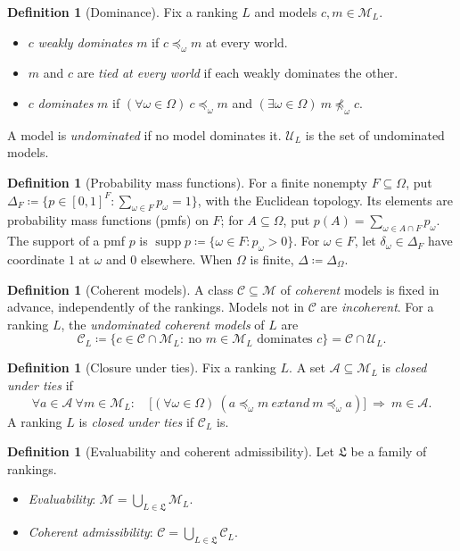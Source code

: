 \documentclass[11pt]{article}
\theoremstyle{definition}
\newtheorem{definition}[theorem]{Definition}
\theoremstyle{remark}
\newcommand{\M}{\mathcal M}
\newcommand{\C}{\mathcal C}
\newcommand{\U}{\mathcal U}
\newcommand{\Lf}{\mathfrak L}
\newcommand{\supp}{\operatorname{supp}}
\begin{document}
\begin{definition}[Dominance]\label{def:dominance}
Fix a ranking $L$ and models $c,m\in\M_L$.
\begin{itemize}[leftmargin=*]
\item $c$ \emph{weakly dominates} $m$ if $c\preceq_\omega m$ at every world.
\item $m$ and $c$ are \emph{tied at every world} if each weakly dominates the other.
\item $c$ \emph{dominates} $m$ if $(\forall\omega\in\Omega)\ c\preceq_\omega m$ and $(\exists\omega\in\Omega)\ m\not\preceq_\omega c$.
\end{itemize}
A model is \emph{undominated} if no model dominates it. $\U_L$ is the set of undominated models.
\end{definition}

\begin{definition}[Probability mass functions]\label{def:priors}
For a finite nonempty $F\subseteq\Omega$, put $\Delta_F\coloneqq\{p\in[0,1]^F:\sum_{\omega\in F}p_\omega=1\}$, with the Euclidean topology. Its elements are probability mass functions (pmfs) on $F$; for $A\subseteq\Omega$, put $p(A)=\sum_{\omega\in A\cap F}p_\omega$. The support of a pmf $p$ is $\supp p\coloneqq\{\omega\in F:p_\omega>0\}$. For $\omega\in F$, let $\delta_\omega\in\Delta_F$ have coordinate $1$ at $\omega$ and $0$ elsewhere. When $\Omega$ is finite, $\Delta\coloneqq\Delta_\Omega$.
\end{definition}

\begin{definition}[Coherent models]\label{def:coherence-property}
A class $\C\subseteq\M$ of \emph{coherent} models is fixed in advance, independently of the rankings. Models not in $\C$ are \emph{incoherent}. For a ranking $L$, the \emph{undominated coherent models} of $L$ are
\[
\C_L\coloneqq\{c\in\C\cap\M_L:\ \text{no } m\in\M_L \text{ dominates } c\}=\C\cap\U_L.
\]
\end{definition}

\begin{definition}[Closure under ties]\label{def:tie-closure}
Fix a ranking $L$. A set $\mathcal A\subseteq\M_L$ is \emph{closed under ties} if
\[
\forall a\in\mathcal A\ \forall m\in\M_L:\quad
\bigl[(\forall\omega\in\Omega)\ (a\preceq_\omega m\ 	ext{and}\ m\preceq_\omega a)\bigr]\ \Longrightarrow\ m\in\mathcal A.
\] A ranking $L$ is \emph{closed under ties} if $\C_L$ is.
\end{definition}

\begin{definition}[Evaluability and coherent admissibility]\label{def:family-assumptions}
Let $\Lf$ be a family of rankings.
\begin{itemize}[leftmargin=*]
\item \emph{Evaluability}: $\M=\bigcup_{L\in\Lf}\M_L$.
\item \emph{Coherent admissibility}: $\C=\bigcup_{L\in\Lf}\C_L$.
\end{itemize}
\end{definition}
\end{document}
